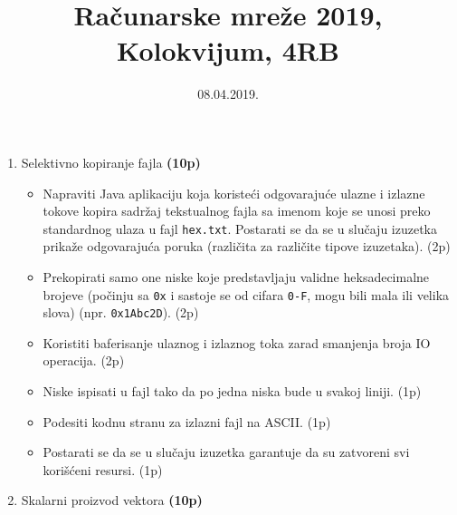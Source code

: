 \documentclass[]{article}
\title{Ra\v{c}unarske mre\v{z}e 2019, Kolokvijum, 4RB}
\author{}
\date{08.04.2019.}
\begin{document}
\maketitle

\begin{enumerate}
  \item Selektivno kopiranje fajla \textbf{(10p)}
  \begin{itemize}
    \item Napraviti Java aplikaciju koja koriste\'c{}i odgovaraju\'c{}e ulazne i izlazne tokove kopira sadr\v{z}aj tekstualnog fajla sa imenom koje se unosi preko standardnog ulaza u fajl \texttt{hex.txt}. Postarati se da se u slu\v{c}aju izuzetka prika\v{z}e odgovaraju\'c{}a poruka (razli\v{c}ita za razli\v{c}ite tipove izuzetaka). \hfill (2p)
    \item Prekopirati samo one niske koje predstavljaju validne heksadecimalne brojeve (po\v{c}inju sa \texttt{0x} i sastoje se od cifara \texttt{0-F}, mogu bili mala ili velika slova) (npr. \texttt{0x1Abc2D}). \hfill (2p)
    \item Koristiti baferisanje ulaznog i izlaznog toka zarad smanjenja broja IO operacija. \hfill (2p)
    \item Niske ispisati u fajl tako da po jedna niska bude u svakoj liniji. \hfill (1p)
    \item Podesiti kodnu stranu za izlazni fajl na ASCII. \hfill (1p)
    \item Postarati se da se u slu\v{c}aju izuzetka garantuje da su zatvoreni svi kori\v{s}\'c{}eni resursi. \hfill (1p)
  \end{itemize}

  \item Skalarni proizvod vektora \textbf{(10p)}


\end{enumerate}
\end{document}

